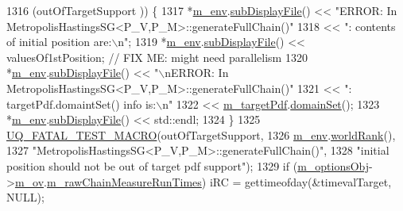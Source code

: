 \begin{DoxyCode}
1316       (outOfTargetSupport    )) \{
1317     *\hyperlink{class_q_u_e_s_o_1_1_metropolis_hastings_s_g_ac8ea061e55b920e0c8f9bce5c3f20e52}{m\_env}.\hyperlink{class_q_u_e_s_o_1_1_base_environment_a8a0064746ae8dddfece4229b9ad374d6}{subDisplayFile}() << \textcolor{stringliteral}{"ERROR: In
       MetropolisHastingsSG<P\_V,P\_M>::generateFullChain()"}
1318                             << \textcolor{stringliteral}{": contents of initial position are:\(\backslash\)n"};
1319     *\hyperlink{class_q_u_e_s_o_1_1_metropolis_hastings_s_g_ac8ea061e55b920e0c8f9bce5c3f20e52}{m\_env}.\hyperlink{class_q_u_e_s_o_1_1_base_environment_a8a0064746ae8dddfece4229b9ad374d6}{subDisplayFile}() << valuesOf1stPosition; \textcolor{comment}{// FIX ME: might need parallelism}
1320     *\hyperlink{class_q_u_e_s_o_1_1_metropolis_hastings_s_g_ac8ea061e55b920e0c8f9bce5c3f20e52}{m\_env}.\hyperlink{class_q_u_e_s_o_1_1_base_environment_a8a0064746ae8dddfece4229b9ad374d6}{subDisplayFile}() << \textcolor{stringliteral}{"\(\backslash\)nERROR: In
       MetropolisHastingsSG<P\_V,P\_M>::generateFullChain()"}
1321                             << \textcolor{stringliteral}{": targetPdf.domaintSet() info is:\(\backslash\)n"}
1322                             << \hyperlink{class_q_u_e_s_o_1_1_metropolis_hastings_s_g_a42ce4ffcb3addf62dd3f19fe8bb09268}{m\_targetPdf}.\hyperlink{class_q_u_e_s_o_1_1_base_scalar_function_ad0937628825249dd36ded3ce0c7959ac}{domainSet}();
1323     *\hyperlink{class_q_u_e_s_o_1_1_metropolis_hastings_s_g_ac8ea061e55b920e0c8f9bce5c3f20e52}{m\_env}.\hyperlink{class_q_u_e_s_o_1_1_base_environment_a8a0064746ae8dddfece4229b9ad374d6}{subDisplayFile}() << std::endl;
1324   \}
1325   \hyperlink{_defines_8h_a56d63d18d0a6d45757de47fcc06f574d}{UQ\_FATAL\_TEST\_MACRO}(outOfTargetSupport,
1326                       \hyperlink{class_q_u_e_s_o_1_1_metropolis_hastings_s_g_ac8ea061e55b920e0c8f9bce5c3f20e52}{m\_env}.\hyperlink{class_q_u_e_s_o_1_1_base_environment_a78b57112bbd0e6dd0e8afec00b40ffa7}{worldRank}(),
1327                       \textcolor{stringliteral}{"MetropolisHastingsSG<P\_V,P\_M>::generateFullChain()"},
1328                       \textcolor{stringliteral}{"initial position should not be out of target pdf support"});
1329   \textcolor{keywordflow}{if} (\hyperlink{class_q_u_e_s_o_1_1_metropolis_hastings_s_g_a5d0bc9f73d50d272aa6bfb5ef5939ef3}{m\_optionsObj}->\hyperlink{class_q_u_e_s_o_1_1_metropolis_hastings_s_g_options_a9d4792d9fc2dc5439b8ab489b0c236eb}{m\_ov}.\hyperlink{class_q_u_e_s_o_1_1_mh_options_values_a6fcc2efc9146b68548e62d707aeed883}{m\_rawChainMeasureRunTimes}) iRC = 
      gettimeofday(&timevalTarget, NULL);

\end{DoxyCode}
